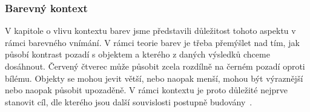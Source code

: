 \subsubsection{Barevný kontext}
V kapitole o vlivu kontextu barev jsme představili důležitost tohoto aspektu v rámci barevného vnímání. V rámci
teorie barev je třeba přemýšlet nad tím, jak působí kontrast pozadí s objektem a kterého z daných výsledků chceme dosáhnout.
Červený čtverec může působit zcela rozdílně na černém pozadí oproti bílému. Objekty se mohou jevit větší, nebo naopak menší, mohou
být výraznější nebo naopak působit upozaděně. V rámci kontextu je proto důležité nejprve stanovit cíl, dle kterého jsou další souvislosti postupně budovány~\cite{colormatters_basic_color_theory}.


